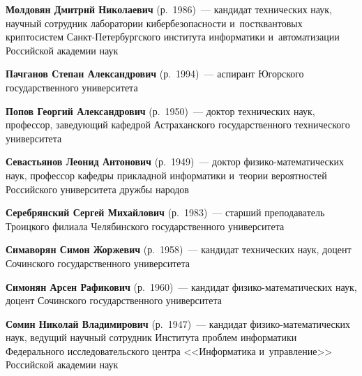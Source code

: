\begin{multicols}{2}

\noindent
\textbf{Молдовян Дмитрий Николаевич} (р.\ 1986)~--- 
кандидат технических наук, научный сотрудник ла\-боратории кибербезопасности
 и~постквантовых крип\-тосистем Санкт-Пе\-тер\-бург\-ско\-го 
 института \mbox{информатики} и~автоматизации Российской академии наук


\noindent
\textbf{Пачганов Степан Александрович} (р.\ 1994)~--- 
аспирант Югорского государственного университета


\noindent
\textbf{Попов Георгий Александрович} (р.\ 1950)~--- 
доктор технических наук, профессор, заведующий кафедрой 
Астраханского государственного технического университета


\noindent
\textbf{Севастьянов Леонид Антонович} (р.\ 1949)~--- 
доктор фи\-зи\-ко-ма\-те\-ма\-ти\-че\-ских наук, профессор кафедры 
прикладной информатики и~теории вероятностей Российского университета дружбы народов


\noindent
\textbf{Серебрянский Сергей Михайлович} (р.\ 1983)~--- 
старший преподаватель Троицкого филиала Челябинского государственного университета


\noindent
\textbf{Симаворян Симон Жоржевич} (р.\ 1958)~--- 
кандидат технических наук, доцент Сочинского государственного университета


\noindent
\textbf{Симонян Арсен Рафикович} (р.\ 1960)~--- кандидат 
фи\-зи\-ко-ма\-те\-ма\-ти\-че\-ских наук, 
доцент Сочинского государственного университета




\noindent
\textbf{Сомин Николай Владимирович} (р.\ 1947)~--- 
кандидат фи\-зи\-ко-ма\-те\-ма\-ти\-че\-ских наук, ведущий научный 
сотрудник Института проб\-лем информатики Федерального исследовательского 
центра <<Информатика и~управ\-ле\-ние>> Российской академии наук


\end{multicols}
